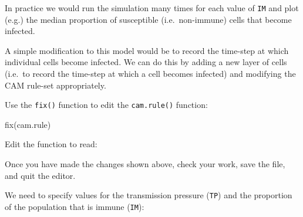 \documentclass[
  12pt,
  a4paper]{book}
\newenvironment{Shaded}{\begin{snugshade}}{\end{snugshade}}
\newcommand{\ControlFlowTok}[1]{\textcolor[rgb]{0.13,0.29,0.53}{\textbf{#1}}}
\newcommand{\DecValTok}[1]{\textcolor[rgb]{0.00,0.00,0.81}{#1}}
\newcommand{\FunctionTok}[1]{\textcolor[rgb]{0.00,0.00,0.00}{#1}}
\newcommand{\NormalTok}[1]{#1}
\newcommand{\OtherTok}[1]{\textcolor[rgb]{0.56,0.35,0.01}{#1}}
\newcommand{\SpecialCharTok}[1]{\textcolor[rgb]{0.00,0.00,0.00}{#1}}
\begin{document}
In practice we would run the simulation many times for each value of \texttt{IM} and plot (e.g.) the median proportion of susceptible (i.e.~non-immune) cells that become infected.

A simple modification to this model would be to record the time-step at which individual cells become infected.
We can do this by adding a new layer of cells (i.e.~to record the time-step at which a cell becomes infected) and modifying the CAM rule-set appropriately.

Use the \texttt{fix()} function to edit the \texttt{cam.rule()} function:

\begin{Shaded}
\begin{Highlighting}[]
\FunctionTok{fix}\NormalTok{(cam.rule)}
\end{Highlighting}
\end{Shaded}

Edit the function to read:

\begin{Shaded}
\end{Shaded}

Once you have made the changes shown above, check your work, save the file, and quit the editor.

We need to specify values for the transmission pressure (\texttt{TP}) and the proportion of the population that is immune (\texttt{IM}):
\end{document}
